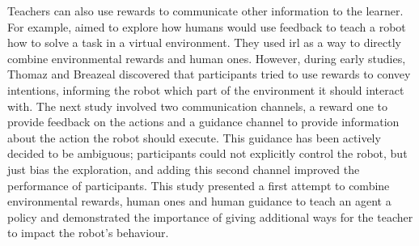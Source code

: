 

Teachers can also use rewards to communicate other information to the learner. For example, \cite{thomaz2008teachable} aimed to explore how humans would use feedback to teach a robot how to solve a task in a virtual environment. They used \acrfull{irl} as a way to directly combine environmental rewards and human ones. However, during early studies, Thomaz and Breazeal discovered that participants tried to use rewards to convey intentions, informing the robot which part of the environment it should interact with. The next study involved two communication channels, a reward one to provide feedback on the actions and a guidance channel to provide information about the action the robot should execute. This guidance has been actively decided to be ambiguous; participants could not explicitly control the robot, but just bias the exploration, and adding this second channel improved the performance of participants. This study presented a first attempt to combine environmental rewards, human ones and human guidance to teach an agent a policy and demonstrated the importance of giving additional ways for the teacher to impact the robot's behaviour.



